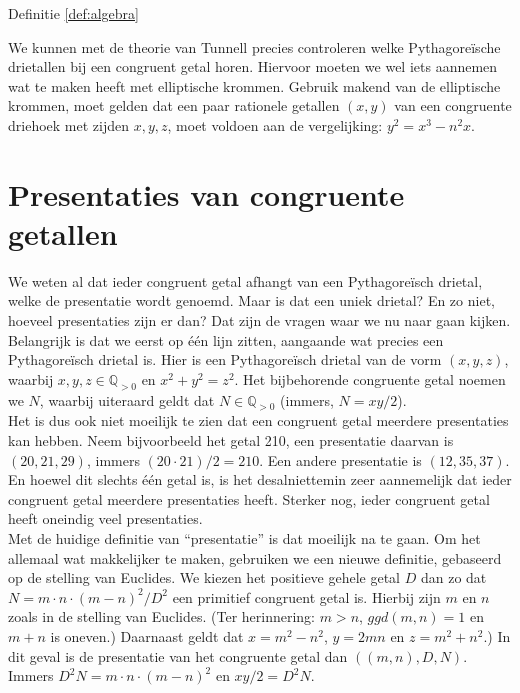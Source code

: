 \documentclass[12pt,reqno]{article}
\newcommand*{\QQ}{\ensuremath{\mathbb{Q}}}
\theoremstyle{theorem}
\theoremstyle{definition}
\begin{document}
	
	
	Definitie \ref{def:algebra}
	
	
	We kunnen met de theorie van Tunnell precies controleren welke Pythagore\"ische drietallen bij een congruent getal horen. Hiervoor moeten we wel iets aannemen wat te maken heeft met elliptische krommen. Gebruik makend van de elliptische krommen, moet gelden dat een paar rationele getallen $(x,y)$ van een congruente driehoek met zijden $x,y,z$, moet voldoen aan de vergelijking: $y^2=x^3-n^2x$.
	
	
	\section{Presentaties van congruente getallen}
	We weten al dat ieder congruent getal afhangt van een Pythagore\"isch drietal, welke de presentatie wordt genoemd. Maar is dat een uniek drietal? En zo niet, hoeveel presentaties zijn er dan? Dat zijn de vragen waar we nu naar gaan kijken.\\
	
	Belangrijk is dat we eerst op \'e\'en lijn zitten, aangaande wat precies een Pythagore\"isch drietal is. Hier is een Pythagore\"isch drietal van de vorm $(x,y,z)$, waarbij $x,y,z\in \QQ_{>0}$ en $x^2 + y^2 = z^2$. Het bijbehorende congruente getal noemen we $N$, waarbij uiteraard geldt dat $N\in \QQ_{>0}$ (immers, $N = xy / 2$).\\
	
	Het is dus ook niet moeilijk te zien dat een congruent getal meerdere presentaties kan hebben. Neem bijvoorbeeld het getal 210, een presentatie daarvan is $(20,21,29)$, immers $(20\cdot 21)/2 = 210$. Een andere presentatie is $(12,35,37)$. En hoewel dit slechts \'e\'en getal is, is het desalniettemin zeer aannemelijk dat ieder congruent getal meerdere presentaties heeft. Sterker nog, ieder congruent getal heeft oneindig veel presentaties.\\
	
	Met de huidige definitie van ``presentatie'' is dat moeilijk na te gaan. Om het allemaal wat makkelijker te maken, gebruiken we een nieuwe definitie, gebaseerd op {\color{red}de stelling van Euclides}. We kiezen het positieve gehele getal $D$ dan zo dat $N=m\cdot n \cdot (m-n)^2/D^2$ een primitief congruent getal is. Hierbij zijn $m$ en $n$ zoals in de stelling van Euclides. (Ter herinnering: $m>n$, $ggd(m,n) = 1$ en $m+n$ is oneven.) Daarnaast geldt dat $x = m^2 - n^2$, $y = 2mn$ en $z = m^2 + n^2$.) In dit geval is de presentatie van het congruente getal dan $((m,n),D,N)$. Immers $D^2N = m\cdot n \cdot (m-n)^2$ en $xy/2 = D^2N$.\\
	
\end{document}
